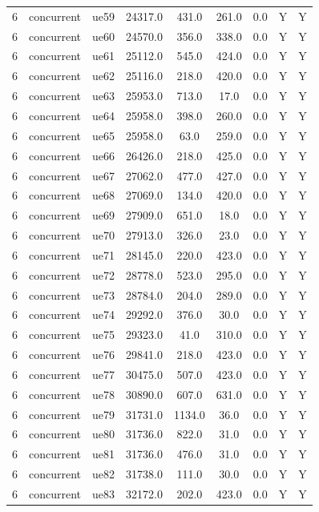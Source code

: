 \begin{table}[ht]
\begin{tabular}{|c|c|c|c|c|c|c|c|c|}
6 & concurrent & ue59 & 24317.0 & 431.0 & 261.0 & 0.0 & Y & Y \\
6 & concurrent & ue60 & 24570.0 & 356.0 & 338.0 & 0.0 & Y & Y \\
6 & concurrent & ue61 & 25112.0 & 545.0 & 424.0 & 0.0 & Y & Y \\
6 & concurrent & ue62 & 25116.0 & 218.0 & 420.0 & 0.0 & Y & Y \\
6 & concurrent & ue63 & 25953.0 & 713.0 & 17.0 & 0.0 & Y & Y \\
6 & concurrent & ue64 & 25958.0 & 398.0 & 260.0 & 0.0 & Y & Y \\
6 & concurrent & ue65 & 25958.0 & 63.0 & 259.0 & 0.0 & Y & Y \\
6 & concurrent & ue66 & 26426.0 & 218.0 & 425.0 & 0.0 & Y & Y \\
6 & concurrent & ue67 & 27062.0 & 477.0 & 427.0 & 0.0 & Y & Y \\
6 & concurrent & ue68 & 27069.0 & 134.0 & 420.0 & 0.0 & Y & Y \\
6 & concurrent & ue69 & 27909.0 & 651.0 & 18.0 & 0.0 & Y & Y \\
6 & concurrent & ue70 & 27913.0 & 326.0 & 23.0 & 0.0 & Y & Y \\
6 & concurrent & ue71 & 28145.0 & 220.0 & 423.0 & 0.0 & Y & Y \\
6 & concurrent & ue72 & 28778.0 & 523.0 & 295.0 & 0.0 & Y & Y \\
6 & concurrent & ue73 & 28784.0 & 204.0 & 289.0 & 0.0 & Y & Y \\
6 & concurrent & ue74 & 29292.0 & 376.0 & 30.0 & 0.0 & Y & Y \\
6 & concurrent & ue75 & 29323.0 & 41.0 & 310.0 & 0.0 & Y & Y \\
6 & concurrent & ue76 & 29841.0 & 218.0 & 423.0 & 0.0 & Y & Y \\
6 & concurrent & ue77 & 30475.0 & 507.0 & 423.0 & 0.0 & Y & Y \\
6 & concurrent & ue78 & 30890.0 & 607.0 & 631.0 & 0.0 & Y & Y \\
6 & concurrent & ue79 & 31731.0 & 1134.0 & 36.0 & 0.0 & Y & Y \\
6 & concurrent & ue80 & 31736.0 & 822.0 & 31.0 & 0.0 & Y & Y \\
6 & concurrent & ue81 & 31736.0 & 476.0 & 31.0 & 0.0 & Y & Y \\
6 & concurrent & ue82 & 31738.0 & 111.0 & 30.0 & 0.0 & Y & Y \\
6 & concurrent & ue83 & 32172.0 & 202.0 & 423.0 & 0.0 & Y & Y \\

\end{tabular}
\end{table}
